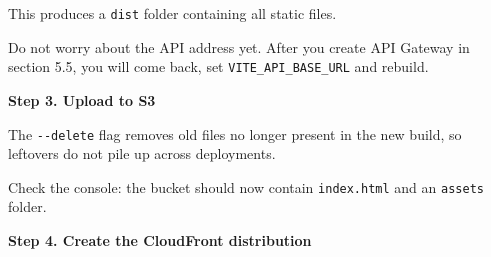 \begin{Shaded}
\begin{Highlighting}[]
\end{Highlighting}
\end{Shaded}

This produces a \texttt{dist} folder containing all static files.

Do not worry about the API address yet. After you create API Gateway in
section 5.5, you will come back, set \texttt{VITE\_API\_BASE\_URL} and
rebuild.

\vspace{0.5em}\noindent\textbf{Step 3. Upload to S3}\par

\begin{Shaded}
\begin{Highlighting}[]
\OperatorTok{\textless{}}\OperatorTok{\textgreater{}}\NormalTok{/ }
\end{Highlighting}
\end{Shaded}

The \texttt{-\/-delete} flag removes old files no longer present in the
new build, so leftovers do not pile up across deployments.

Check the console: the bucket should now contain \texttt{index.html} and
an \texttt{assets} folder.

\vspace{0.5em}\noindent\textbf{Step 4. Create the CloudFront
distribution}\par


